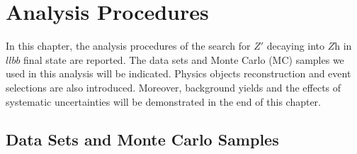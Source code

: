 \chapter{Analysis Procedures}

In this chapter, the analysis procedures of the search for $Z'$ decaying into $Z$h in $llbb$ final state are reported. The data sets and Monte Carlo (MC) samples we used in this analysis will be indicated. Physics objects reconstruction and event selections are also introduced. Moreover, background yields and the effects of systematic uncertainties will be demonstrated in the end of this chapter.

\section{Data Sets and Monte Carlo Samples}
